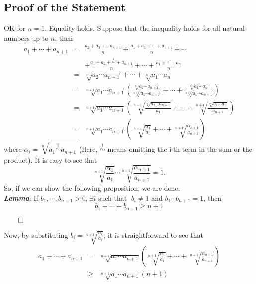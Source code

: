 \documentclass{article}
\begin{document}
\subsection{Proof of the Statement}
\label{sec-1-2}
OK for $n=1$. Equality holds. Suppose that the inequality holds for all natural numbers up to $n$, then
\begin{eqnarray*}
a_1 + \cdots + a_{n+1} & = & \frac{a_2 + a_3 \cdots + a_{n+1}}{n} + \frac{a_1 + a_3 + \cdots + a_{n+1}}{n} + \cdots  \nonumber \\
                       &  &  + \frac{a_1 + a_2 + \overset{i}{\breve{\cdots} } + a_{n+1}}{n} + \cdots + \frac{a_1 + \cdots + a_{n}}{n}\nonumber\\
                       & = &  \sqrt[n]{a_2\cdots a_{n+1}} + \cdots + \sqrt[n]{a_1\cdots a_n} \nonumber \\
                       & = &  \sqrt[n+1]{a_1\cdots a_{n+1}} \left( \frac{\sqrt[n]{a_2\cdots a_{n+1}}}{\sqrt[n+1]{a_1\cdots a_{n+1}}} + \cdots + \frac{\sqrt[n]{a_1\cdots a_n}}{\sqrt[n+1]{a_1\cdots a_{n+1}}} \right) \nonumber \\
                       & = &  \sqrt[n+1]{a_1\cdots a_{n+1}} \left( \sqrt[n+1]{\frac{\sqrt[n]{a_2\cdots a_{n+1}}}{a_1}} + \cdots + \sqrt[n+1]{\frac{\sqrt[n]{a_1\cdots a_{n}}}{a_{n+1}}}\right) \nonumber \\
                       & = &  \sqrt[n+1]{a_1\cdots a_{n+1}} \left( \sqrt[n+1]{\frac{\alpha_1}{a_1}} + \cdots + \sqrt[n+1]{\frac{\alpha_{n+1}}{a_{n+1}}}\right) 
\end{eqnarray*}
where $\alpha_i=\sqrt[n]{a_1\overset{i}{\breve{\cdots}} a_{n+1}}$ (Here, $\overset{i}{\breve{\cdots}}$ means omitting the i-th term in the sum or the product). It is easy to see that
\begin{equation*}
\label{ }
\sqrt[n+1]{\frac{\alpha_1}{a_1}}  \cdots  \sqrt[n+1]{\frac{\alpha_{n+1}}{a_{n+1}}} = 1.
\end{equation*}
So, if we can show the following proposition, we are done.\\
\textbf{\emph{Lemma}}:
 If $b_1, \cdots, b_{n+1} >0$, $\exists i$ such that $\;b_i \ne 1$ and $b_1 \cdots b_{n+1} = 1$, then
\begin{equation}
\label{AM_GM_normalised}
b_1 + \cdots + b_{n+1} \ge n+1
\end{equation}
\begin{right}
$\qed$
\end{right}

Now, by substituting $b_i = \sqrt[n+1]{\frac{\alpha_i}{a_i}}$, it is straightforward to see that
\begin{eqnarray*}
a_1 + \cdots + a_{n+1} & = &  \sqrt[n+1]{a_1\cdots a_{n+1}} \left( \sqrt[n+1]{\frac{\alpha_1}{a_1}} + \cdots + \sqrt[n+1]{\frac{\alpha_{n+1}}{a_{n+1}}}\right) \nonumber \\
                       & \ge &  \sqrt[n+1]{a_1\cdots a_{n+1}} (n + 1 ) \nonumber \\
\end{eqnarray*}
\end{document}
